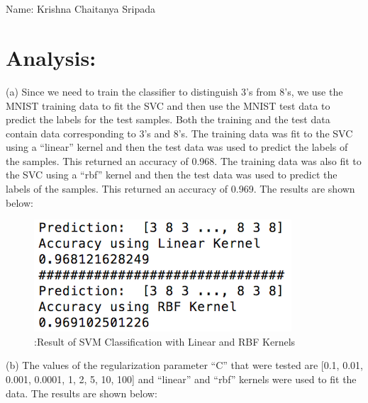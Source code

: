 \documentclass[10pt]{article}
\begin{document}
\section*{}
\begin{flushleft}
Name: Krishna Chaitanya Sripada\\
\end{flushleft}
\section*{Analysis: }
\begin{flushleft}
(a) Since we need to train the classifier to distinguish 3's from 8's, we use the MNIST training data to fit the SVC and then use the MNIST test data to predict the labels for the test samples. Both the training and the test data contain data corresponding to 3's and 8's. The training data was fit to the SVC using a ``linear'' kernel and then the test data was used to predict the labels of the samples. This returned an accuracy of 0.968. The training data was also fit to the SVC using a ``rbf'' kernel and then the test data was used to predict the labels of the samples. This returned an accuracy of 0.969. The results are shown below:\\
\begin{figure}[!htp]
\includegraphics{result1.png}
\caption{:Result of SVM Classification with Linear and RBF Kernels}
\end{figure}
\vspace{0.5em}
(b) The values of the regularization parameter ``C'' that were tested are [0.1, 0.01, 0.001, 0.0001, 1, 2, 5, 10, 100] and ``linear'' and ``rbf'' kernels were used to fit the data. The results are shown below:\\
\begin{figure}[!htp]

\end{figure}
\end{flushleft}
\end{document}
